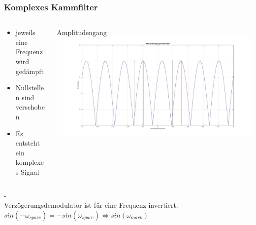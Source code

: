 \documentclass{beamer}
\begin{document}
\begin{frame}
	\frametitle{Komplexes Kammfilter}
	\begin{columns}
		\begin{column}{0.3\textwidth}
			
			\begin{itemize}
				\item jeweils eine Frequenz wird gedämpft
				\item Nullstellen sind verschoben
				\item Es entsteht ein komplexes Signal
			\end{itemize}
		\end{column}
		\begin{column}{0.7\textwidth}
			Amplitudengang
			\includegraphics[width=\textwidth]{images/comb.png}
		\end{column}
	\end{columns} 
	  -\\
	Verzögerungsdemodulator ist für eine Frequenz invertiert.
	$sin(-\omega_{space}) = -sin(\omega_{space}) \Longleftrightarrow sin(\omega_{mark})$
\end{frame}
\end{document}
